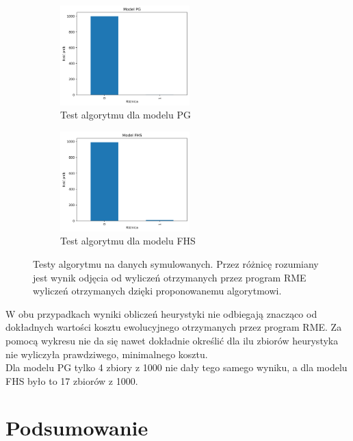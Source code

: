 \documentclass[licencjacka]{pracamgr}
\begin{document}
\begin{figure}[H]
\centering
\begin{subfigure}{.5\textwidth}
  \centering
  \includegraphics[width=50mm]{./pictures/PG.png}
  \caption{Test algorytmu dla modelu PG}
\end{subfigure}%
\begin{subfigure}{.5\textwidth}
  \centering
  \includegraphics[width=50mm]{./pictures/FHS.png}
  \caption{Test algorytmu dla modelu FHS}
\end{subfigure}%
\caption{Testy algorytmu na danych symulowanych. Przez różnicę rozumiany jest wynik odjęcia od wyliczeń otrzymanych przez program RME wyliczeń otrzymanych dzięki proponowanemu algorytmowi. }
\end{figure}

W obu przypadkach wyniki obliczeń heurystyki nie odbiegają znacząco od dokładnych wartości kosztu ewolucyjnego otrzymanych przez program RME. Za pomocą wykresu nie da się nawet dokładnie określić dla ilu zbiorów heurystyka nie wyliczyła prawdziwego, minimalnego kosztu.\\
Dla modelu PG tylko 4 zbiory z 1000 nie dały tego samego wyniku, a dla modelu FHS było to 17 zbiorów z 1000.

\chapter{Podsumowanie}
\end{document}
